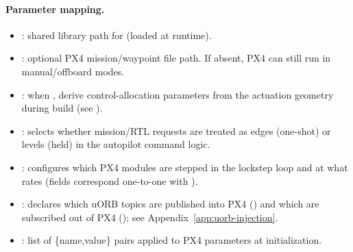 \paragraph{Parameter mapping.}
\begin{itemize}[leftmargin=*,itemsep=2pt]
  \item {}: shared library path for  (loaded at runtime).
  \item {}: optional PX4 mission/waypoint file path. If absent, PX4 can still run in manual/offboard modes.
  \item {}: when , derive control-allocation parameters from the actuation geometry during build (see ).
  \item {}: selects whether mission/RTL requests are treated as edges (one-shot) or levels (held) in the autopilot command logic.
  \item \code{[px4.lockstep]}: configures which PX4 modules are stepped in the lockstep loop and at what rates (fields correspond one-to-one with ).
  \item \code{[px4.uorb]}: declares which uORB topics are published into PX4 () and which are subscribed out of PX4 (); see Appendix~\ref{app:uorb-injection}.
  \item \code{[[px4.params]]}: list of \{name,value\} pairs applied to PX4 parameters at initialization.
\end{itemize}
